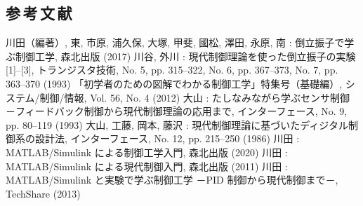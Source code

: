 \newpage
\begin{center}
	\section*{参\,考\,文\,献}                      %
\end{center}

\begin{thebibliography}{8}
	 川田（編著）, 東, 市原, 浦久保, 大塚, 甲斐, 國松, 澤田, 永原, 南 : 倒立振子で学ぶ制御工学, 森北出版 (2017)
	 川谷, 外川 : 現代制御理論を使った倒立振子の実験 [1]–[3], トランジスタ技術, No. 5, pp. 315–322, No. 6, pp. 367–373, No. 7, pp. 363–370 (1993)
	 「初学者のための図解でわかる制御工学」特集号（基礎編）, システム/制御/情報, Vol. 56, No. 4 (2012)
	 大山 : たしなみながら学ぶセンサ制御 －フィードバック制御から現代制御理論の応用まで, インターフェース, No. 9, pp. 80–119 (1993)
	 大山, 工藤, 岡本, 藤沢 : 現代制御理論に基づいたディジタル制御系の設計法, インターフェース, No. 12, pp. 215–250 (1986)
	 川田 : MATLAB/Simulink による制御工学入門, 森北出版 (2020)
	 川田 : MATLAB/Simulink による現代制御入門, 森北出版 (2011)
	 川田 : MATLAB/Simulink と実験で学ぶ制御工学 －PID 制御から現代制御まで－, TechShare (2013)
\end{thebibliography}

